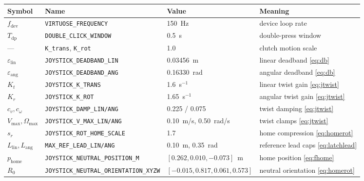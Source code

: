 \begin{tabularx}{\linewidth}{@{}l>{\scriptsize\raggedright\arraybackslash}p{3.6cm}l>{\raggedright\arraybackslash}X@{}}
\toprule
Symbol & Name & Value & Meaning \\
\midrule
$f_{\text{dev}}$ & \texttt{VIRTUOSE\_FREQUENCY} & 150~Hz & device loop rate \\
$T_{\text{dp}}$ & \texttt{DOUBLE\_CLICK\_WINDOW} & 0.5~s & double-press window \\
--- & \texttt{K\_trans}, \texttt{K\_rot} & 1.0 & clutch motion scale \\
$\varepsilon_{\text{lin}}$ & \texttt{JOYSTICK\_\allowbreak DEADBAND\_\allowbreak LIN} & 0.03456~m & linear deadband \eqref{eq:db} \\
$\varepsilon_{\text{ang}}$ & \texttt{JOYSTICK\_\allowbreak DEADBAND\_\allowbreak ANG} & 0.16330~rad & angular deadband \eqref{eq:db} \\
$K_t$ & \texttt{JOYSTICK\_K\_TRANS} & 1.6~s$^{-1}$ & linear twist gain \eqref{eq:jtwist} \\
$K_r$ & \texttt{JOYSTICK\_K\_ROT} & 1.65~s$^{-1}$ & angular twist gain \eqref{eq:jtwist} \\
$c_v, c_\omega$ & \texttt{JOYSTICK\_\allowbreak DAMP\_\allowbreak LIN/ANG} & 0.225 / 0.075 & twist damping \eqref{eq:jtwist} \\
$V_{\max}, \Omega_{\max}$ & \texttt{JOYSTICK\_\allowbreak V\_\allowbreak MAX\_\allowbreak LIN/ANG} & 0.10~m/s, 0.50~rad/s & twist clamps \eqref{eq:jtwist} \\
$s_r$ & \texttt{JOYSTICK\_\allowbreak ROT\_\allowbreak HOME\_\allowbreak SCALE} & 1.7 & home compression \eqref{eq:homerot} \\
$L_{\text{lin}}, L_{\text{ang}}$ & \texttt{MAX\_\allowbreak REF\_\allowbreak LEAD\_\allowbreak LIN/ANG} & 0.10~m, 0.35~rad & reference lead caps \eqref{eq:latchlead} \\
$p_{\text{home}}$ & \texttt{JOYSTICK\_\allowbreak NEUTRAL\_\allowbreak POSITION\_\allowbreak M} & $[0.262, 0.010, -0.073]$~m & home position \eqref{eq:fhome} \\
$R_0$ & \texttt{JOYSTICK\_\allowbreak NEUTRAL\_\allowbreak ORIENTATION\_\allowbreak XYZW} & $[-0.015, 0.817, 0.061, 0.573]$ & neutral orientation \eqref{eq:homerot} \\
\bottomrule
\end{tabularx}


